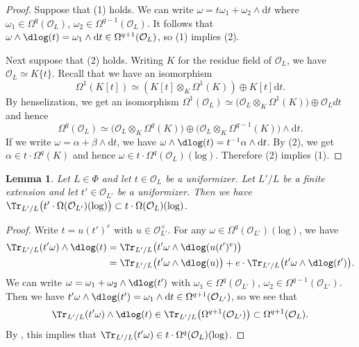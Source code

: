 \documentclass{amsart}
\theoremstyle{plain}
\newtheorem{lemma}[theorem]{Lemma}
\theoremstyle{definition}
\theoremstyle{remark}
\numberwithin{equation}{section}
\def\logrm{\mathrm{log}}
\begin{document}
\begin{proof}
    Suppose that (1) holds.
    We can write $\omega = t\omega_1+\omega_2\wedge\mathrm{d}t$ where $\omega_1\in \Omega^q(\mathcal{O}_L)$, $\omega_2\in \Omega^{q-1}(\mathcal{O}_L)$.
    It follows that $\omega\wedge\dlog(t) = \omega_1\wedge \mathrm{d}t\in \Omega^{q+1}(\mathcal{O}_L)$, so (1) implies (2).
    
    Next suppose that (2) holds.
    Writing $K$ for the residue field of $\mathcal{O}_L$, we have $\mathcal{O}_L\simeq K\{t\}$.
    Recall that we have an isomorphism
    $$
        \Omega^1(K[t])\simeq (K[t]\otimes_K \Omega^1(K))\oplus K[t]\mathrm{d}t.
    $$
    By henselization, we get an isomorphism $\Omega^1(\mathcal{O}_L)\simeq \bigl(\mathcal{O}_L\otimes_K\Omega^1(K)\bigr)\oplus \mathcal{O}_L dt$ and hence
    $$
        \Omega^q(\mathcal{O}_L)\simeq \bigl(\mathcal{O}_L\otimes_K\Omega^q(K)\bigr)\oplus \bigl(\mathcal{O}_L\otimes_K\Omega^{q-1}(K)\bigr)\wedge \mathrm{d}t.
    $$
    If we write $\omega = \alpha+\beta\wedge \mathrm{d}t$, we have $\omega\wedge\dlog(t) = t^{-1}\alpha\wedge \mathrm{d}t$.
    By (2), we get $\alpha\in t\cdot \Omega^q(K)$ and hence $\omega\in t\cdot \Omega^q(\mathcal{O}_L)(\logrm)$.
    Therefore (2) implies (1).
\end{proof}

\begin{lemma}\label{omega_trace}
	Let $L\in \Phi$ and let $t\in \mathcal{O}_L$ be a uniformizer.
	Let $L'/L$ be a finite extension and let $t'\in \mathcal{O}_{L'}$ be a uniformizer.
	Then we have $\Tr_{L'/L}\bigl(t'\cdot \Omega(\mathcal{O}_{L'})(\logrm)\bigr)\subset t\cdot \Omega(\mathcal{O}_L)(\logrm)$.
\end{lemma}

\begin{proof}
	Write $t=u(t')^e$ with $u\in \mathcal{O}_{L'}^\times$.
	For any $\omega\in \Omega^q(\mathcal{O}_{L'})(\logrm)$, we have
	\begin{align*}
		\Tr_{L'/L}(t' \omega)\wedge \dlog(t)
            &{}=\Tr_{L'/L}\bigl(t' \omega\wedge\dlog(u(t')^e)\bigr)\\
		&{}=\Tr_{L'/L}\bigl(t' \omega\wedge \dlog(u)\bigr)
            + e\cdot\Tr_{L'/L}\bigl(t' \omega\wedge \dlog(t')\bigr).
        \end{align*}
        We can write $\omega = \omega_1+\omega_2\wedge\dlog(t')$ with $\omega_1\in \Omega^q(\mathcal{O}_{L'})$, $\omega_2\in \Omega^{q-1}(\mathcal{O}_{L'})$.
        Then we have $t'\omega\wedge\dlog(t') = \omega_1\wedge \mathrm{d}t\in \Omega^{q+1}(\mathcal{O}_{L'})$, so we see that
        $$
		\Tr_{L'/L}(t' \omega)\wedge \dlog(t)\in \Tr_{L'/L}\bigl(\Omega^{q+1}(\mathcal{O}_{L'})\bigr)\subset \Omega^{q+1}(\mathcal{O}_L).
	$$
	By , this implies that $\Tr_{L'/L}(t' \omega)\in t\cdot \Omega^q(\mathcal{O}_L)(\logrm)$.
\end{proof}
\end{document}
